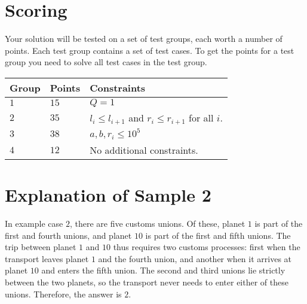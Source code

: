 \section*{Scoring}
Your solution will be tested on a set of test groups, each worth a number of points. Each test group contains
a set of test cases. To get the points for a test group you need to solve all test cases in the test group.

\noindent
\begin{tabular}{| l | l | p{12cm} |}
  \hline
  \textbf{Group} & \textbf{Points} & \textbf{Constraints} \\ \hline
  $1$   & $15$        & $Q=1$  \\ \hline
  $2$   & $35$        & $l_i \le l_{i + 1}$ and $r_i \le r_{i+1}$ for all $i$. \\ \hline
  $3$   & $38$       & $ a,b,r_i \leq 10^5$ \\ \hline
  $4$   & $12$       &  No additional constraints. \\ \hline
\end{tabular}

\section*{Explanation of Sample 2}
In example case $2$, there are five customs unions.
Of these, planet $1$ is part of the first and fourth unions, and planet $10$ is part of the first and fifth unions.
The trip between planet $1$ and $10$ thus requires two customs processes: first when the transport leaves planet $1$ and the fourth union, and another when it arrives at planet $10$ and enters the fifth union.
The second and third unions lie strictly between the two planets, so the transport never needs to enter either of these unions.
Therefore, the answer is $2$.

